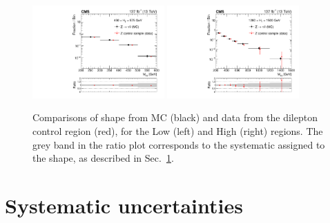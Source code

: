 \begin{figure}[ht]
  \begin{center}
    \includegraphics[width=0.45\textwidth]{figs/zinv/MT2L_W_GJ_log.pdf}
    \includegraphics[width=0.45\textwidth]{figs/zinv/MT2H_W_GJ_log.pdf}
    \caption{Comparisons of \mttwo shape from \znunu MC (black) and \zll
      data from the dilepton control region (red), for the Low (left) and
      High (right) \Ht regions. The grey band in the ratio plot corresponds
      to the systematic assigned to the \znunu shape, as described in Sec.~\ref{sec:zinv_syst}.
            }
    \label{fig:zinv_mt2shape}
  \end{center}
\end{figure}


\section{Systematic uncertainties}
\label{sec:zinv_syst}

